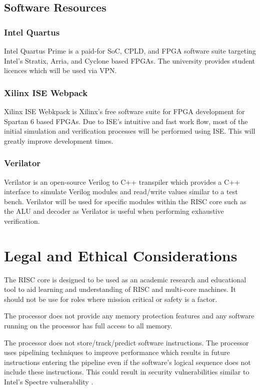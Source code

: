 \subsection{Software Resources}
\subsubsection{Intel Quartus}
Intel Quartus Prime is a paid-for SoC, CPLD, and FPGA software suite targeting Intel's Stratix, Arria, and Cyclone based FPGAs. The university provides student licences which will be used via VPN.


\subsubsection{Xilinx ISE Webpack}
Xilinx ISE Webkpack is Xilinx's free software suite for FPGA development for Spartan 6 based FPGAs.
Due to ISE's intuitive and fast work flow, most of the initial simulation and verification processes will be performed using ISE. This will greatly improve development times.

\subsubsection{Verilator}
Verilator is an open-source Verilog to C++ transpiler which provides a C++ interface to simulate Verilog modules and read/write values similar to a test bench. Verilator will be used for specific modules within the RISC core such as the ALU and decoder as Verilator is useful when performing exhaustive verification.

\section{Legal and Ethical Considerations}
The RISC core is designed to be used as an academic research and educational tool to aid learning and understanding of RISC and multi-core machines. It should not be use for roles where mission critical or safety is a factor. 

The processor does not provide any memory protection features and any software running on the processor has full access to all memory.

The processor does not store/track/predict software instructions. The processor uses pipelining techniques to improve performance which results in future instructions entering the pipeline even if the software's logical sequence does not include these instructions. This could result in security vulnerabilities similar to Intel's Spectre vulnerability \cite{kocher2018spectre}.


